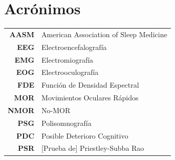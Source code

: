 \documentclass[12pt,letterpaper]{book}
\begin{document}
\chapter*{Acrónimos}

\begin{tabular}{rl}
\textbf{AASM} & American Association of Sleep Medicine
\\
\textbf{EEG} & Electroencefalografía
\\
\textbf{EMG} & Electromiografía
\\
\textbf{EOG} & Electrooculografía
\\
\textbf{FDE} & Función de Densidad Espectral
\\
\textbf{MOR} & Movimientos Oculares Rápidos
\\
\textbf{NMOR}& No-MOR
\\
\textbf{PSG} & Polisomnografía
\\
\textbf{PDC} & Posible Deterioro Cognitivo
\\
\textbf{PSR} & [Prueba de] Priestley-Subba Rao
\\
\end{tabular}

\newpage


\thispagestyle{empty}

\tableofcontents
\newpage


\setcounter{page}{1}

\end{document}
